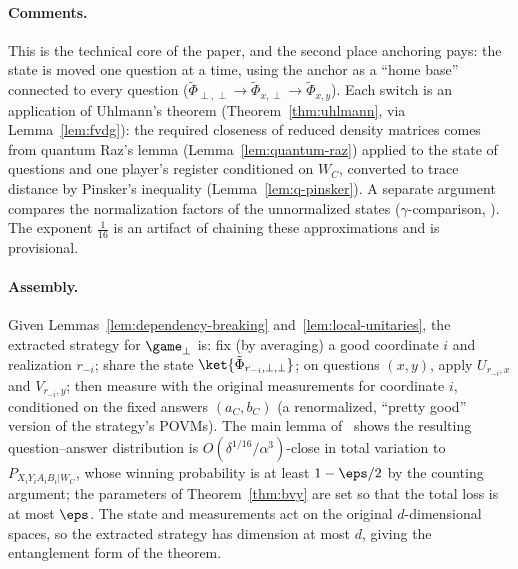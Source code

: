 \paragraph{Comments.} This is the technical core of the paper, and the second place
anchoring pays: the state is moved one question at a time, using the anchor as a
``home base'' connected to every question ($\tilde\Phi_{\perp,\perp} \to
\tilde\Phi_{x,\perp} \to \tilde\Phi_{x,y}$). Each switch is an application of
Uhlmann's theorem (Theorem~\ref{thm:uhlmann}, via Lemma~\ref{lem:fvdg}): the required
closeness of reduced density matrices comes from quantum Raz's lemma
(Lemma~\ref{lem:quantum-raz}) applied to the state of questions and one player's
register conditioned on $W_C$, converted to trace distance by Pinsker's inequality
(Lemma~\ref{lem:q-pinsker}). A separate argument compares the normalization factors of
the unnormalized states ($\gamma$-comparison, \cite[Lemma 5.17]{BVY17}). The exponent
$\frac{1}{16}$ is an artifact of chaining these approximations and is provisional.

\paragraph{Assembly.} Given Lemmas~\ref{lem:dependency-breaking}
and~\ref{lem:local-unitaries}, the extracted strategy for $\game_\perp$ is: fix (by
averaging) a good coordinate $i$ and realization $r_{-i}$; share the state
$\ket{\tilde\Phi_{r_{-i}, \perp, \perp}}$; on questions $(x, y)$, apply $U_{r_{-i},
x}$ and $V_{r_{-i}, y}$; then measure with the original measurements for coordinate
$i$, conditioned on the fixed answers $(a_C, b_C)$ (a renormalized, ``pretty good''
version of the strategy's POVMs). The main lemma of~\cite[Section 6]{BVY17} shows the
resulting question--answer distribution is $O(\delta^{1/16}/\alpha^3)$-close in total
variation to $P_{X_i Y_i A_i B_i | W_C}$, whose winning probability is at least $1 -
\eps/2$ by the counting argument; the parameters of Theorem~\ref{thm:bvy} are set so
that the total loss is at most $\eps$. The state and measurements act on the original
$d$-dimensional spaces, so the extracted strategy has dimension at most $d$, giving
the entanglement form of the theorem.
